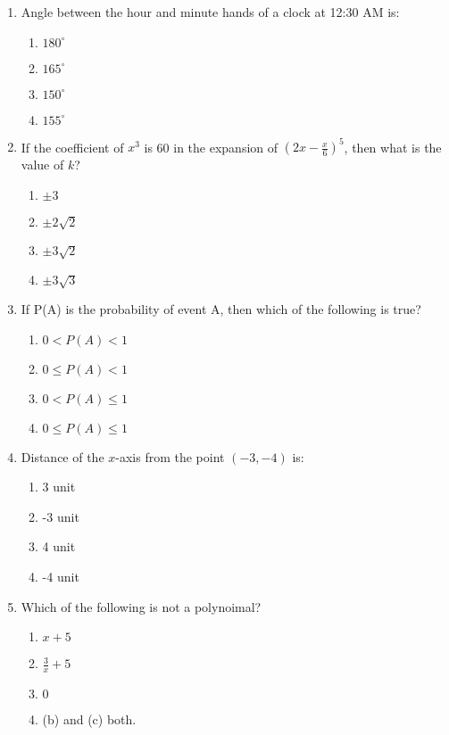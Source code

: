\documentclass[12pt]{article}
\begin{document}
\begin{enumerate}
    \item Angle between the hour and minute hands of a clock at 12:30 AM is:
    \begin{enumerate}
        \item $180^\circ$
        \item $165^\circ$
        \item $150^\circ$
        \item $155^\circ$
    \end{enumerate}

    \item If the coefficient of $x^3$ is 60 in the expansion of $(2x - \frac{x}{6})^5$, then what is the value of $k$?
    \begin{enumerate}
        \item $\pm 3$
        \item $\pm 2\sqrt{2}$
        \item $\pm 3\sqrt{2}$
        \item $\pm 3\sqrt{3}$
    \end{enumerate}

    \item If P(A) is the probability of event A, then which of the following is true?
    \begin{enumerate}
        \item $0 < P(A) < 1$
        \item $0 \leq P(A) < 1$
        \item $0 < P(A) \leq 1$
        \item $0 \leq P(A) \leq 1$
    \end{enumerate}

    \item Distance of the $x$-axis from the point $(-3, -4)$ is:
    \begin{enumerate}
        \item 3 unit
        \item -3 unit
        \item 4 unit
        \item -4 unit
    \end{enumerate}

    \item Which of the following is not a polynoimal?
    \begin{enumerate}
        \item $x + 5$
        \item $\frac{3}{x} + 5$
        \item $0$
        \item (b) and (c) both.
    \end{enumerate}


\end{enumerate}
\end{document}
